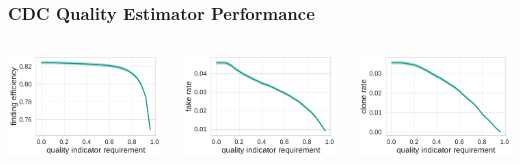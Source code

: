\documentclass[18pt, aspectratio=169]{beamer}
\begin{document}
\begin{frame}
  \frametitle{CDC Quality Estimator Performance}
  \begin{columns}
    \begin{column}{.33\textwidth}
      \centering
      \includegraphics[width=\textwidth]{figures/cdc-qi-new/findeff.pdf}\\
    \end{column}
    \begin{column}{.33\textwidth}
      \centering
            \includegraphics[width=\textwidth]{figures/cdc-qi-new/fake_rate.pdf}\\
    \end{column}
    \begin{column}{.33\textwidth}
      \centering
      \includegraphics[width=\textwidth]{figures/cdc-qi-new/clone_rate.pdf}

\end{column}
\end{columns}
\end{frame}
\end{document}
